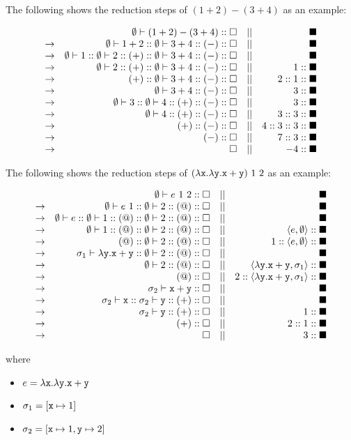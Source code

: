 The following shows the reduction steps of $(1+2)-(3+4)$ as an example:

\[
\begin{array}{lrcr}
& \emptyset\vdash(1+2)-(3+4)::\square &||& \blacksquare \\
\rightarrow & \emptyset\vdash1+2::\emptyset\vdash3+4::(-):: \square &||&
\blacksquare \\
\rightarrow &
\emptyset\vdash1::\emptyset\vdash2::(+):: \emptyset\vdash3+4::(-):: \square &||&
\blacksquare \\
\rightarrow & \emptyset\vdash2::(+):: \emptyset\vdash3+4::(-):: \square &||&
1::\blacksquare \\
\rightarrow & (+):: \emptyset\vdash3+4::(-):: \square &||& 2::1::\blacksquare \\
\rightarrow & \emptyset\vdash3+4::(-):: \square &||& 3::\blacksquare \\
\rightarrow & \emptyset\vdash3::\emptyset\vdash4::(+):: (-):: \square &||&
3::\blacksquare \\
\rightarrow & \emptyset\vdash4::(+):: (-):: \square &||& 3::3::\blacksquare \\
\rightarrow & (+):: (-):: \square &||& 4::3::3::\blacksquare \\
\rightarrow & (-):: \square &||& 7::3::\blacksquare \\
\rightarrow & \square &||& -4::\blacksquare \\
\end{array}
\]

The following shows the reduction steps of
$(\lambda\texttt{x}.\lambda\texttt{y}.\texttt{x}+\texttt{y})\ 1\ 2$ as an example:

\[
\begin{array}{lrcr}
              & \emptyset\vdash e\ 1\ 2:: \square &||& \blacksquare \\
  \rightarrow & \emptyset\vdash e\ 1:: \emptyset\vdash2:: (@):: \square &||& \blacksquare \\
  \rightarrow & \emptyset\vdash e:: \emptyset\vdash1:: (@):: \emptyset\vdash2:: (@):: \square &||& \blacksquare \\
  \rightarrow & \emptyset\vdash1:: (@):: \emptyset\vdash2:: (@):: \square &||& \langle e,\emptyset\rangle::\blacksquare \\
  \rightarrow & (@):: \emptyset\vdash2:: (@):: \square &||& 1::\langle e,\emptyset\rangle::\blacksquare \\
  \rightarrow & \sigma_1\vdash\lambda \texttt{y}.\texttt{x}+\texttt{y}:: \emptyset\vdash2:: (@):: \square &||& \blacksquare \\
  \rightarrow & \emptyset\vdash2:: (@):: \square &||& \langle\lambda\texttt{y}.\texttt{x}+\texttt{y},\sigma_1\rangle::\blacksquare \\
  \rightarrow & (@):: \square &||& 2::\langle\lambda\texttt{y}.\texttt{x}+\texttt{y},\sigma_1\rangle::\blacksquare \\
  \rightarrow & \sigma_2\vdash\texttt{x}+\texttt{y}:: \square &||& \blacksquare \\
  \rightarrow & \sigma_2\vdash\texttt{x}:: \sigma_2\vdash\texttt{y}:: (+):: \square &||& \blacksquare \\
  \rightarrow & \sigma_2\vdash\texttt{y}:: (+):: \square &||& 1::\blacksquare \\
  \rightarrow & (+):: \square &||& 2::1::\blacksquare \\
  \rightarrow & \square &||& 3::\blacksquare \\
\end{array}
\]

where

\begin{itemize}
  \item $e=\lambda\texttt{x}.\lambda\texttt{y}.\texttt{x}+\texttt{y}$
  \item $\sigma_1=[\texttt{x}\mapsto1]$
  \item $\sigma_2=[\texttt{x}\mapsto1,\texttt{y}\mapsto2]$
\end{itemize}

